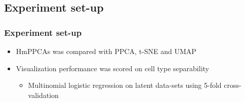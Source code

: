 \documentclass{beamer}
\begin{document}
\subsection{Experiment set-up}

\begin{frame}
\frametitle{Experiment set-up}
\begin{itemize}
    \item HmPPCAs was compared with PPCA, t-SNE and UMAP
    \item Visualization performance was scored on cell type separability
    \begin{itemize}
        \item Multinomial logistic regression on latent data-sets using 5-fold cross-validation
    \end{itemize}
\end{itemize}


\end{frame}
\end{document}
